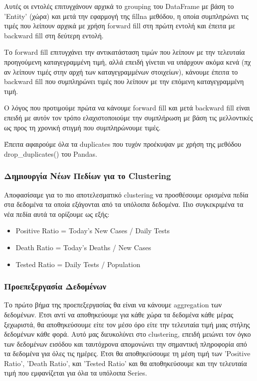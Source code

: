 \documentclass[12pt,a4paper]{article}
\begin{document}
Αυτές οι εντολές επιτυγχάνουν αρχικά το grouping του DataFrame με βάση το 'Entity' (χώρα) και μετά την εφαρμογή της fillna μεθόδου, η οποία συμπληρώνει τις τιμές που λείπουν αρχικά με χρήση forward fill στη πρώτη εντολή και έπειτα με backward fill στη δεύτερη εντολή.

Το forward fill επιτυγχάνει την αντικατάσταση τιμών που λείπουν με την τελευταία προηγούμενη καταγεγραμμένη τιμή, αλλά επειδή γίνεται να υπάρχουν ακόμα κενά (πχ αν λείπουν τιμές στην αρχή των καταγεγραμμένων στοιχείων), κάνουμε έπειτα το backward fill που συμπληρώνει τιμές που λείπουν με την επόμενη καταγεγραμμένη τιμή.

Ο λόγος που προτιμούμε πρώτα να κάνουμε forward fill και μετά backward fill είναι επειδή με αυτόν τον τρόπο ελαχιστοποιούμε την συμπλήρωση με βάση τις μελλοντικές ως προς τη χρονική στιγμή που συμπληρώνουμε τιμές.

Έπειτα αφαιρούμε όλα τα duplicates που τυχόν προέκυψαν με χρήση της μεθόδου drop\_duplicates() του Pandas.

\subsubsection{Δημιουργία Νέων Πεδίων για το Clustering}

Αποφασίσαμε για το πιο αποτελεσματικό clustering να προσθέσουμε ορισμένα πεδία στα δεδομένα τα οποία εξάγονται από τα υπόλοιπα δεδομένα. Πιο συγκεκριμένα τα νέα πεδία αυτά τα ορίζουμε ως εξής:

\begin{itemize}
    \item Positive Ratio = Today's New Cases / Daily Tests
    \item Death Ratio = Today's Deaths / New Cases
    \item Tested Ratio = Daily Tests / Population
\end{itemize}

\subsubsection{Προεπεξεργασία Δεδομένων}

Το πρώτο βήμα της προεπεξεργασίας θα είναι να κάνουμε aggregation των δεδομένων. Έτσι αντί να αποθηκεύουμε για κάθε χώρα τα δεδομένα κάθε μέρας ξεχωριστά, θα αποθηκεύσουμε είτε τον μέσο όρο είτε την τελευταία τιμή μιας στήλης δεδομένων κάθε φορά. Αυτό μας διευκολύνει στο clustering, επειδή μειώνει τον όγκο των δεδομένων εισόδου και ταυτόχρονα απομονώνει την σημαντική πληροφορία από τα δεδομένα για όλες τις ημέρες. Έτσι θα αποθηκεύσουμε τη μέση τιμή των 'Positive Ratio', 'Death Ratio', και 'Tested Ratio' και θα αποθηκεύσουμε και την τελευταία τιμή που εμφανίζεται για όλα τα υπόλοιπα Series.
\end{document}
